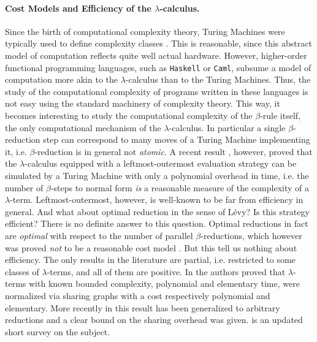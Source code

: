 \begin{LONG}
	\paragraph{Cost Models and Efficiency of the $\lambda$-calculus.}Since the birth of computational complexity theory, Turing Machines were typically used to define complexity classes \cite{hartmanis_computational_1965}. This is reasonable, since this abstract model of computation reflects quite well actual hardware. However, higher-order functional programming languages, such as \texttt{Haskell} or \texttt{Caml}, subsume a model of computation more akin to the $\lambda$-calculus than to the Turing Machines. Thus, the study of the computational complexity of programs written in these languages is not easy using the standard machinery of complexity theory. This way, it becomes interesting to study the computational complexity of the $\beta$-rule itself, the only computational mechanism of the $\lambda$-calculus. In particular a single $\beta$-reduction step can correspond to many moves of a Turing Machine implementing it, i.e. $\beta$-reduction is in general not \emph{atomic}. A recent result \cite{accattoli_leftmost-outermost_2016}, however, proved that the $\lambda$-calculus equipped with a leftmost-outermost evaluation strategy can be simulated by a Turing Machine with only a polynomial overhead in time, i.e. the number of $\beta$-steps to normal form \emph{is} a reasonable measure of the complexity of a $\lambda$-term. Leftmost-outermost, however, is well-known to be far from efficiency in general. And what about optimal reduction in the sense of Lévy? Is this strategy efficient? There is no definite answer to this question. Optimal reductions in fact are \emph{optimal} with respect to the number of parallel $\beta$-reductions, which however was proved \emph{not} to be a reasonable cost model \cite{asperti_parallel_2001}. But this tell us nothing about efficiency. The only results in the literature are partial, i.e. restricted to some classes of $\lambda$-terms, and all of them are positive. In \cite{baillot_light_2011} the authors proved that $\lambda$-terms with known bounded complexity, polynomial and elementary time, were normalized via sharing graphs with a cost respectively polynomial and elementary. More recently in \cite{guerrini_is_2017} this result has been generalized to arbitrary reductions and a clear bound on the sharing overhead was given. \cite{asperti_about_2017} is an updated short survey on the subject.

\end{LONG}
